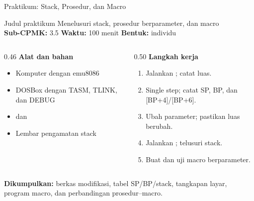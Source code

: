 \documentclass[aspectratio=169,11pt]{beamer}
\begin{document}
\begin{frame}{Praktikum: Stack, Prosedur, dan Macro}
\begin{block}{Judul praktikum}
\small Menelusuri stack, prosedur berparameter, dan macro\\[0.15em]
\textbf{Sub-CPMK:} 3.5 \quad\textbullet\quad
\textbf{Waktu:} 100 menit \quad\textbullet\quad
\textbf{Bentuk:} individu
\end{block}

\vspace{0.2em}
\begin{columns}[t]
\begin{column}{0.46\textwidth}
{\color{obeBlue}\bfseries Alat dan bahan}
\begin{itemize}\footnotesize
    \item Komputer dengan emu8086
    \item DOSBox dengan TASM, TLINK, dan DEBUG
    \item {} dan 
    \item Lembar pengamatan stack
\end{itemize}
\end{column}
\begin{column}{0.50\textwidth}
{\color{obeBlue}\bfseries Langkah kerja}
\begin{enumerate}\footnotesize
    \item Jalankan ; catat luas.
    \item Single step; catat SP, BP, dan [BP+4]/[BP+6].
    \item Ubah parameter; pastikan luas berubah.
    \item Jalankan ; telusuri stack.
    \item Buat dan uji macro berparameter.
\end{enumerate}
\end{column}
\end{columns}

\vspace{0.2em}
{\footnotesize\textbf{Dikumpulkan:} berkas  modifikasi,
tabel SP/BP/stack, tangkapan layar, program macro, dan perbandingan
prosedur--macro.\par}
\end{frame}
\end{document}
